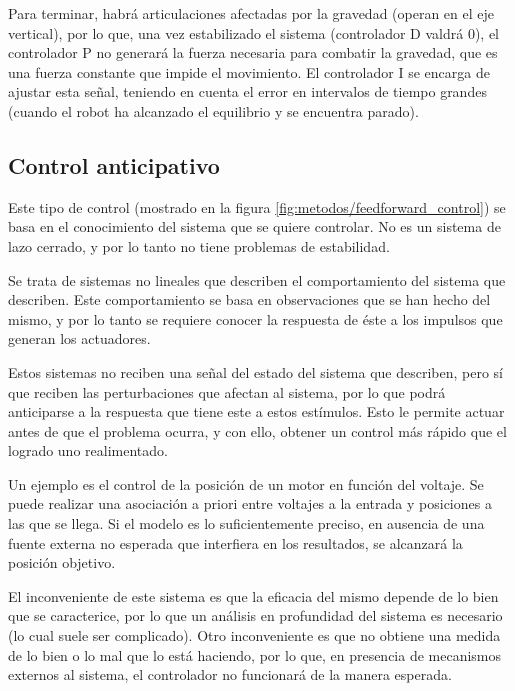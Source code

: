 Para terminar, habrá articulaciones afectadas por la gravedad (operan en el eje vertical), por lo que, una vez estabilizado el sistema (controlador D valdrá 0), el controlador P no generará la fuerza necesaria para combatir la gravedad, que es una fuerza constante que impide el movimiento. El controlador I se encarga de ajustar esta señal, teniendo en cuenta el error en intervalos de tiempo grandes (cuando el robot ha alcanzado el equilibrio y se encuentra parado).


\subsection{Control anticipativo}
Este tipo de control (mostrado en la figura \ref{fig:metodos/feedforward_control}) se basa en el conocimiento del sistema que se quiere controlar. No es un sistema de lazo cerrado, y por lo tanto no tiene problemas de estabilidad.

Se trata de sistemas no lineales que describen el comportamiento del sistema que describen. Este comportamiento se basa en observaciones que se han hecho del mismo, y por lo tanto se requiere conocer la respuesta de éste a los impulsos que generan los actuadores.

Estos sistemas no reciben una señal del estado del sistema que describen, pero sí que reciben las perturbaciones que afectan al sistema, por lo que podrá anticiparse a la respuesta que tiene este a estos estímulos. Esto le permite actuar antes de que el problema ocurra, y con ello, obtener un control más rápido que el logrado uno realimentado.

Un ejemplo es el control de la posición de un motor en función del voltaje. Se puede realizar una asociación a priori entre voltajes a la entrada y posiciones a las que se llega. Si el modelo es lo suficientemente preciso, en ausencia de una fuente externa no esperada que interfiera en los resultados, se alcanzará la posición objetivo.

El inconveniente de este sistema es que la eficacia del mismo depende de lo bien que se caracterice, por lo que un análisis en profundidad del sistema es necesario (lo cual suele ser complicado). Otro inconveniente es que no obtiene una medida de lo bien o lo mal que lo está haciendo, por lo que, en presencia de mecanismos externos al sistema, el controlador no funcionará de la manera esperada.


